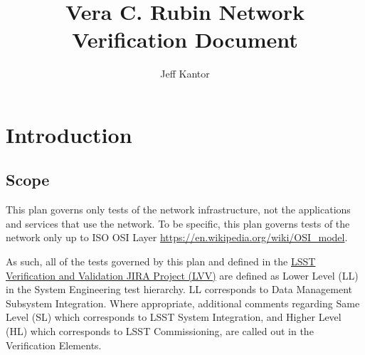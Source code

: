 \documentclass[DM,lsstdraft,STS,toc]{lsstdoc}
\begin{document}
\providecommand{\tightlist}{%
  \setlength{\itemsep}{0pt}\setlength{\parskip}{0pt}}

\def\product{LSST Data Management}


\title[Network Verification Document]{Vera C. Rubin Network Verification Document}

\author{Jeff Kantor}
\setDocRef{\lsstDocType-\lsstDocNum}
\setDocDate{\vcsdate}



\setDocUpstreamVersion{\vcsrevision}

\maketitle


\section{Introduction}\label{sec:intro}


\subsection{Scope}\label{sec:scope}

This plan governs only tests of the network infrastructure, not the applications and services that
use the network. To be specific, this plan governs tests of the network only up to ISO OSI Layer
\url{https://en.wikipedia.org/wiki/OSI_model}.

As such, all of the tests governed by this plan and defined in the 
\href{https://jira.lsstcorp.org/projects/LVV/}{LSST Verification and Validation JIRA Project (LVV)} 
are defined as Lower Level (LL) in the System Engineering test hierarchy. LL
corresponds to Data Management Subsystem Integration. Where appropriate, additional
comments regarding Same Level (SL) which corresponds to LSST System Integration, and Higher
Level (HL) which corresponds to LSST Commissioning, are called out in the Verification
Elements.
\end{document}
